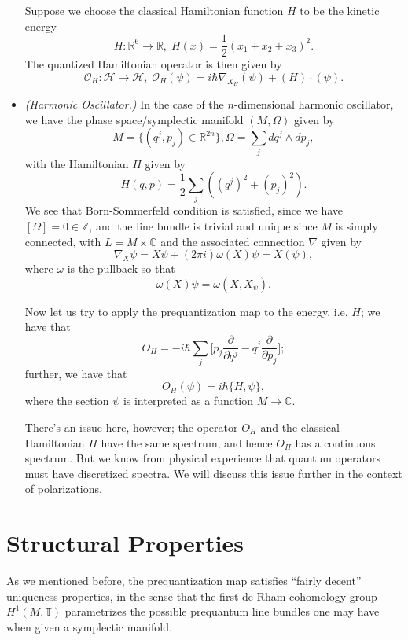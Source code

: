 \documentclass{tufte-handout}
\begin{document}
\begin{itemize}
Suppose we choose the classical Hamiltonian function $H$ to be the kinetic energy
$$
H : \mathbb{R}^6 \to \mathbb{R}, \; H(x) = \frac{1}{2}(x_1 + x_2 + x_3)^2.
$$
The quantized Hamiltonian operator is then given by 
$$
\mathcal{O}_H : \mathcal{H} \to \mathcal{H}, \; \mathcal{O}_H(\psi) = i \hbar \nabla_{X_H}(\psi) + (H)\cdot(\psi).
$$

\item \emph{(Harmonic Oscillator.)} In the case of the $n$-dimensional harmonic oscillator, we have the phase space/symplectic manifold $(M,\Omega)$ given by
$$
M = \{(q^j,p_j) \in \mathbb{R}^{2n}\}, \Omega = \sum_j dq^j \wedge dp_j,
$$
with the Hamiltonian $H$ given by
$$
H(q,p) = \frac{1}{2}\sum_j ((q^j)^2 + (p_j)^2).
$$
We see that Born-Sommerfeld condition is satisfied, since we have $[\Omega] = 0 \in \mathbb{Z}$, and the line bundle is trivial and unique since $M$ is simply connected, with $L = M \times \mathbb{C}$ and the associated connection $\nabla$ given by
$$
\nabla_X \psi = X \psi + (2\pi i)\omega(X)\psi = X(\psi), %
$$
where $\omega$ is the pullback so that
$$
\omega(X)\psi = \omega(X,X_\psi). %
$$

Now let us try to apply the prequantization map to the energy, i.e. $H$; we have that
$$
O_H = -i\hbar\sum_j\biggl[p_j\frac{\partial}{\partial q^j} - q^j\frac{\partial}{\partial p_j} \biggr];
$$
further, we have that
$$
O_H(\psi) = i\hbar\{H,\psi\},
$$
where the section $\psi$ is interpreted as a function $M \to \mathbb{C}$.

There's an issue here, however; the operator $O_H$ and the classical Hamiltonian $H$ have the same spectrum, and hence $O_H$ has a continuous spectrum. But we know from physical experience that quantum operators must have discretized spectra. We will discuss this issue further in the context of polarizations.
\end{itemize}
\section{Structural Properties}

As we mentioned before, the prequantization map satisfies ``fairly decent'' uniqueness properties, in the sense that the first de Rham cohomology group $H^1(M,\mathbb{T})$ parametrizes the possible prequantum line bundles one may have when given a symplectic manifold.
\end{document}
